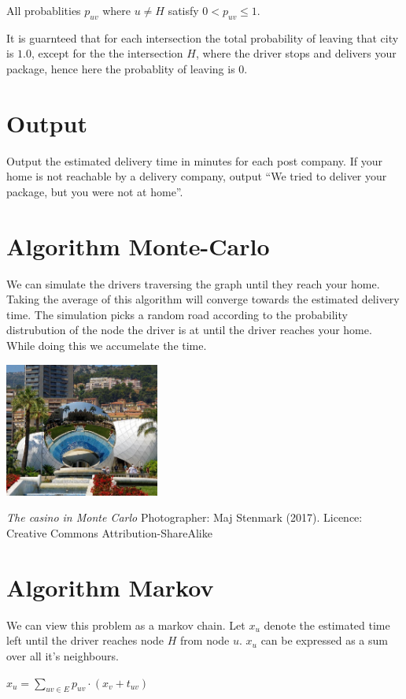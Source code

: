 \documentclass{tufte-handout}
\begin{document}
\medskip

All probablities $p_{uv}$ where $u \neq H$ satisfy $0 < p_{uv} \leq 1$.

It is guarnteed that for each intersection the total probability of leaving that city is $1.0$,
except for the the intersection $H$, where the driver stops and delivers your package, 
hence here the probablity of leaving is $0$.

\section*{Output}
Output the estimated delivery time in minutes for each post company.
If your home is not reachable by a delivery company, output ``We tried to deliver your package, but you were not at home''.


\section*{Algorithm Monte-Carlo}
We can simulate the drivers traversing the graph until they reach your home.
Taking the average of this algorithm will converge towards the estimated delivery time.
The simulation picks a random road according to the probability distrubution 
of the node the driver is at until the driver reaches your home. While doing this we accumelate the time.
\begin{marginfigure}
\includegraphics[width=2in]{montecarlo.jpg}
\caption{\emph{The casino in Monte Carlo} Photographer: Maj Stenmark (2017). Licence: Creative Commons Attribution-ShareAlike}
\end{marginfigure}


\section*{Algorithm Markov}
We can view this problem as a markov chain. 
Let $x_u$ denote the estimated time left until the driver reaches node $H$ from node $u$.
$x_u$ can be expressed as a sum over all it's neighbours.

$x_u = \sum_{uv \in E}{p_{uv}\cdot (x_v + t_{uv})}$
\end{document}
